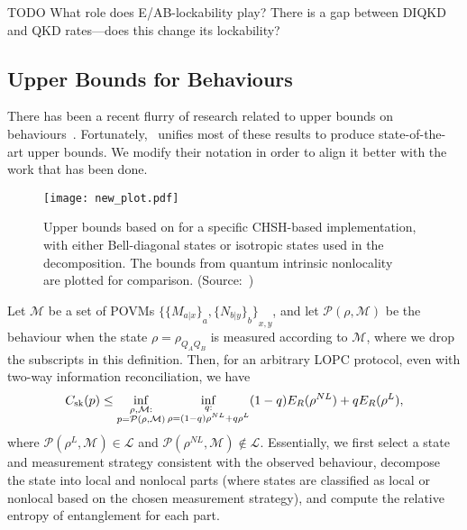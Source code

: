 \documentclass[10pt, a4paper]{article}
\numberwithin{equation}{section} %
\theoremstyle{definition}
\theoremstyle{plain}
\newcommand{\?}{\mathrel{?}} %
\newcommand{\sM}{\mathcal{M}}
\newcommand{\cP}{\mathcal{P}}
\newcommand{\Ls}{\mathcal{L}}
\newcommand{\sk}{\rm sk}
\begin{document}
        TODO What role does E/AB-lockability play? There is a gap between DIQKD and QKD rates---does this change its lockability?

      \subsection{Upper Bounds for Behaviours}

      There has been a recent flurry of research related to upper bounds on behaviours~\cite{NotSufficient, RevisedPeres, DIQKD_QKD_Gap, CCSquashedEntangle, DIQKD_Limits}. Fortunately,~\cite{CCSquashedEntangle} unifies most of these results to produce state-of-the-art upper bounds. We modify their notation in order to align it better with the work that has been done.


      \begin{figure}
        \centering
        \texttt{[image: new\_plot.pdf]}
        \caption{\label{fig:genubound} Upper bounds based on  for a specific CHSH-based implementation, with either Bell-diagonal states or isotropic states used in the decomposition. The bounds from quantum intrinsic nonlocality~\cite{DIQKD_Limits}~\cite[Appendix B]{RevisedPeres} are plotted for comparison. (Source:~\cite{CCSquashedEntangle})}
      \end{figure}

      Let \(\sM\) be a set of POVMs \({\{{\{M_{a|x}\}}_{a}, {\{N_{b|y}\}}_{b}\}}_{x,y}\), and let \(\cP(\rho, \sM)\) be the behaviour when the state \(\rho = \rho_{Q_A Q_B}\) is measured according to \(\sM\), where we drop the subscripts in this definition. Then, for an arbitrary LOPC protocol, even with two-way information reconciliation, we have~\cite[Thm. 3]{CCSquashedEntangle}
      \begin{equation}\label{eqn:genubound}
        C_{\sk}(p) \leq \inf_{\substack{\rho, \sM : \\ p = \cP(\rho, \sM) }} \inf_{\substack{q : \\ \rho = (1-q)\rho^{NL} + q\rho^L}} (1-q) E_R(\rho^{NL}) + q E_R(\rho^L),
      \end{equation}
      where \(\cP(\rho^L, \sM) \in \Ls\) and \(\cP(\rho^{NL}, \sM) \not\in \Ls\). Essentially, we first select a state and measurement strategy consistent with the observed behaviour, decompose the state into local and nonlocal parts (where states are classified as local or nonlocal based on the chosen measurement strategy), and compute the relative entropy of entanglement for each part.
\end{document}
